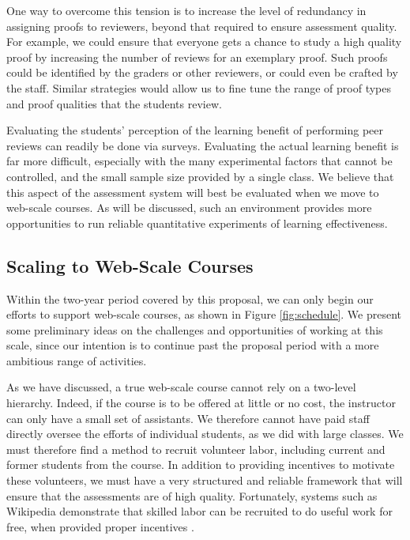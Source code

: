 \documentclass[12pt]{article}
\begin{document}
One way to overcome this tension is to increase the level of
redundancy in assigning proofs to reviewers, beyond that required to
ensure assessment quality.  For example, we could ensure that everyone
gets a chance to study a high quality proof by increasing the number
of reviews for an exemplary proof.  Such proofs could be identified by
the graders or other reviewers, or could even be crafted by the staff.
Similar strategies would allow us to fine tune the range of proof types
and proof qualities that the students review.

Evaluating the students' perception of the learning benefit of
performing peer reviews can readily be done via surveys.  Evaluating
the actual learning benefit is far more difficult, especially with the
many experimental factors that cannot be controlled, and the small sample size
provided by a single class.  We believe that this aspect of the
assessment system will best be evaluated when we move to web-scale
courses.  As will be discussed, such an environment provides more
opportunities to run reliable quantitative experiments of learning
effectiveness. 

\subsection{Scaling to Web-Scale Courses}

Within the two-year period covered by this proposal, we can only
begin our efforts to support web-scale courses, as shown in Figure
\ref{fig:schedule}.  We present some preliminary ideas on the
challenges and opportunities of working at this scale, since our
intention is to continue past the proposal period with a more
ambitious range of activities.

As we have discussed, a true web-scale course cannot rely on a
two-level hierarchy.  Indeed, if the course is to be offered at little
or no cost, the instructor can only have a small set of assistants.
We therefore cannot have paid staff directly oversee the efforts of
individual students, as we did with large classes.  We must therefore
find a method to recruit volunteer labor, including current and former
students from the course.  In addition to providing incentives to
motivate these volunteers, we must have a very structured and reliable
framework that will ensure that the assessments are of high quality.
Fortunately, systems such as Wikipedia demonstrate that skilled labor
can be recruited to do useful work for free, when provided proper incentives
\citep{nov-cacm07}.
\end{document}
